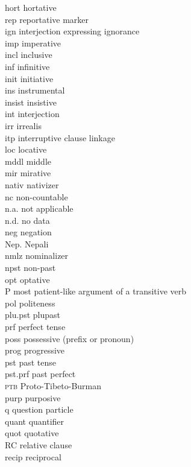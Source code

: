 \begin{refsection}
\begin{multicols}{2}
{\sc hort}  hortative\\
{\sc rep} reportative marker\\
{\sc ign}  interjection expressing ignorance\\
{\sc imp}  imperative\\
{\sc incl} inclusive\\
{\sc inf}  infinitive\\
{\sc init}  initiative\\
{\sc ins}  instrumental\\
{\sc insist}  insistive\\
{\sc int}  interjection\\
{\sc irr} irrealis\\
{\sc itp}  interruptive clause linkage\\
{\sc loc} 	  locative \\
{\sc mddl} middle\\
{\sc mir}  mirative\\
{\sc nativ} nativizer\\
{\sc nc} non-countable\\
n.a. not applicable\\
n.d. no data\\
{\sc neg} 	negation\\
Nep. 	Nepali\\
{\sc nmlz} 	nominalizer\\
{\sc npst}  non-past\\
{\sc opt}  optative\\
P 	 most patient-like argument of a transitive verb\\
{\sc pol} politeness\\
{\sc plu.pst} plupast\\
{\sc prf} perfect tense\\
{\sc poss}  possessive (prefix or pronoun)\\
{\sc prog}  progressive\\
{\sc pst}  past tense\\
{\sc pst.prf}  past perfect\\
\textsc{ptb}  Proto-Tibeto-Burman\\
{\sc purp} purposive\\
{\sc q}  question particle\\
{\sc quant}  quantifier\\
{\sc quot}  quotative\\
{\sc RC}  relative clause\\
{\sc recip}  reciprocal\\

\end{multicols}
\end{refsection}
